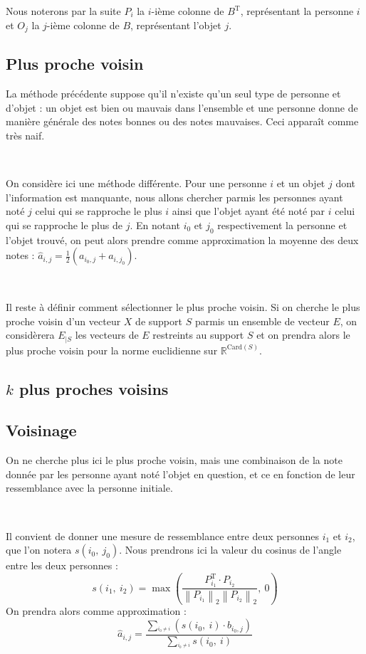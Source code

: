 \documentclass[12pt, a4paper]{article}
\newcommand{\B}{B} %
\newcommand{\Ac}[2]{a_{#1,#2}} %
\newcommand{\Bc}[2]{b_{#1,#2}} %
\newcommand{\Apc}[2]{\widehat{a}_{#1,#2}} %
\newcommand{\norme}[2]{\left\lVert #1 \right\rVert_{#2}} %
\newcommand{\tr}[1]{#1^{\mathrm{T}}} %
\newcommand{\pp}[1]{\left(#1\right)} %
\newcommand{\sdl}{

~

} %
\begin{document}
Nous noterons par la suite $P_i$ la $i$-ième colonne de $\tr{B}$, représentant la personne $i$ et $O_j$ la $j$-ième colonne de $\B$, représentant l'objet $j$.

\subsection{Plus proche voisin}

La méthode précédente suppose qu'il n'existe qu'un seul type de personne et d'objet : un objet est bien ou mauvais dans l'ensemble et une personne donne de manière générale des notes bonnes ou des notes mauvaises. Ceci apparaît comme très naif.
\sdl

On considère ici une méthode différente. Pour une personne $i$ et un objet $j$ dont l'information est manquante, nous allons chercher parmis les personnes ayant noté $j$ celui qui se rapproche le plus $i$ ainsi que l'objet ayant été noté par $i$ celui qui se rapproche le plus de $j$. En notant $i_0$ et $j_0$ respectivement la personne et l'objet trouvé, on peut alors prendre comme approximation la moyenne des deux notes : $\Apc{i}{j} = \frac{1}{2}\pp{\Ac{i_0}{j} + \Ac{i}{j_0}}$.

\sdl
Il reste à définir comment sélectionner le plus proche voisin. Si on cherche le plus proche voisin d'un vecteur $X$ de support $S$ parmis un ensemble de vecteur $E$, on considèrera $E_{|S}$ les vecteurs de $E$ restreints au support $S$ et on prendra alors le plus proche voisin pour la norme euclidienne sur $\mathbb{R}^{\mathrm{Card}\pp{S}}$.

\subsection{$k$ plus proches voisins}

\subsection{Voisinage}

On ne cherche plus ici le plus proche voisin, mais une combinaison de la note donnée par les personne ayant noté l'objet en question, et ce en fonction de leur ressemblance avec la personne initiale.
\sdl
Il convient de donner une mesure de ressemblance entre deux personnes $i_1$ et $i_2$, que l'on notera $s\pp{i_0,\:j_0}$.
Nous prendrons ici la valeur du cosinus de l'angle entre les deux personnes : \[
	s\pp{i_1,\:i_2} = \max\pp{\frac{\tr{P_{i_1}}\!\cdot\!P_{i_2}}{\norme{P_{i_1}}{2}\norme{P_{i_2}}{2}},\:0}
\]
On prendra alors comme approximation : \[
	\Apc{i}{j} = \frac{\underset{^{i_0\neq i}}{\sum}\pp{ s\pp{i_0,\:i}\!\cdot\!\Bc{i_0}{j}}}%
				{\underset{^{i_0\neq i}}{\sum}s\pp{i_0,\:i}}
\]
\end{document}
